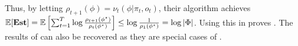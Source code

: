 Thus, by letting $\rho_{t+1}(\phi) = \nu_t(\phi|\pi_t,o_t)$, their algorithm achieves $\mathbb{E}[\textbf{\textup{Est}}] = \mathbb{E}\left[\sum_{t=1}^T \log\frac{\rho_{t+1}(\phi^\star)}{\rho_t(\phi^\star)} \right]\leq \log\frac{1}{\rho_1(\phi^\star)}=\log|\Phi|$. 
Using this in  proves . The results of \cite{xu2023bayesian} can also be recovered as they are special cases of \cite{liu2025decision}. 

